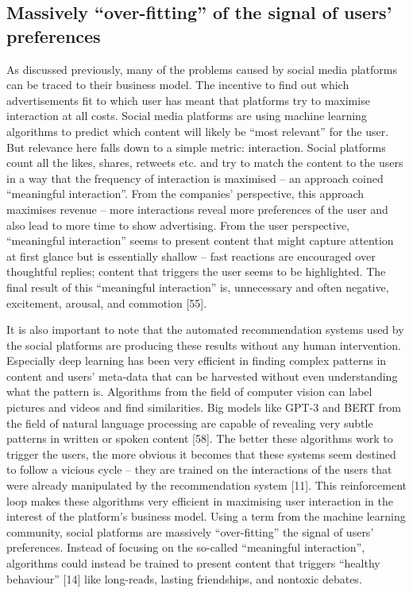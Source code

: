 \documentclass{sistedes}
\begin{document}
\subsection{Massively “over-fitting” of the signal of users’ preferences}
As discussed previously, many of the problems caused by social media platforms can be traced to their business model. The incentive to find out which advertisements fit to which user has meant that platforms try to maximise interaction at all costs. Social media platforms are using machine learning algorithms to predict which content will likely be “most relevant” for the user. But relevance here falls down to a simple metric: interaction. Social platforms count all the likes, shares, retweets etc. and try to match the content to the users in a way that the frequency of interaction is maximised – an approach coined “meaningful interaction”. From the companies’ perspective, this approach maximises revenue – more interactions reveal more preferences of the user and also lead to more time to show advertising. From the user perspective, “meaningful interaction” seems to present content that might capture attention at first glance but is essentially shallow – fast reactions are encouraged over thoughtful replies; content that triggers the user seems to be highlighted. The final result of this “meaningful interaction” is, unnecessary and often negative, excitement, arousal, and commotion [55].

It is also important to note that the automated recommendation systems used by the social platforms are producing these results without any human intervention. Especially deep learning has been very efficient in finding complex patterns in content and users’ meta-data that can be harvested without even understanding what the pattern is. Algorithms from the field of computer vision can label pictures and videos and find similarities. Big models like GPT-3 and BERT from the field of natural language processing are capable of revealing very subtle patterns in written or spoken content [58]. The better these algorithms work to trigger the users, the more obvious it becomes that these systems seem destined to follow a vicious cycle – they are trained on the interactions of the users that were already manipulated by the recommendation system [11]. This reinforcement loop makes these algorithms very efficient in maximising user interaction in the interest of the platform’s business model. Using a term from the machine learning community, social platforms are massively “over-fitting” the signal of users’ preferences. Instead of focusing on the so-called “meaningful interaction”, algorithms could instead be trained to present content that triggers “healthy behaviour” [14] like long-reads, lasting friendships, and nontoxic debates.
\end{document}
